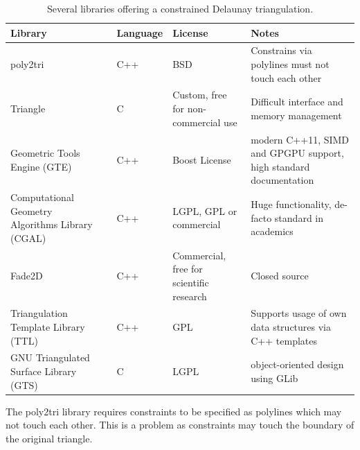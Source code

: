 \renewcommand{\arraystretch}{1.5} %
\begin{table}[h]
	\centering
	\begin{tabular}{p{3cm} l l p{2.1cm} p{3.9cm}}
		Library                                          &                           & Language & License                                  & Notes                                                             \\
		\midrule
		poly2tri                                         & \cite{poly2tri}           & C++      & BSD                                      & Constrains via polylines must not touch each other                \\
		Triangle                                         & \cite{triangle_lib}       & C        & Custom, free for non-commercial use      & Difficult interface and memory management                         \\
		Geometric Tools Engine (GTE)                     & \cite{gte}                & C++      & Boost License                            & modern C++11, SIMD and GPGPU support, high standard documentation \\
		Computational Geometry Algorithms Library (CGAL) & \cite{cgal_triangulation} & C++      & LGPL, GPL or commercial                  & Huge functionality, de-facto standard in academics                \\
		Fade2D                                           & \cite{fade2d}             & C++      & Commercial, free for scientific research & Closed source                                                     \\
		Triangulation Template Library (TTL)             & \cite{ttl}                & C++      & GPL                                      & Supports usage of own data structures via C++ templates           \\
		GNU Triangulated Surface Library (GTS)           & \cite{gts}                & C        & LGPL                                     & object-oriented design using GLib                                 \\
	\end{tabular}
	\caption{
		Several libraries offering a constrained Delaunay triangulation.
	}
	\label{tbl:delaunay_libs}
\end{table}
\renewcommand{\arraystretch}{1.0}

The poly2tri library requires constraints to be specified as polylines which may not touch each other.
This is a problem as constraints may touch the boundary of the original triangle.

